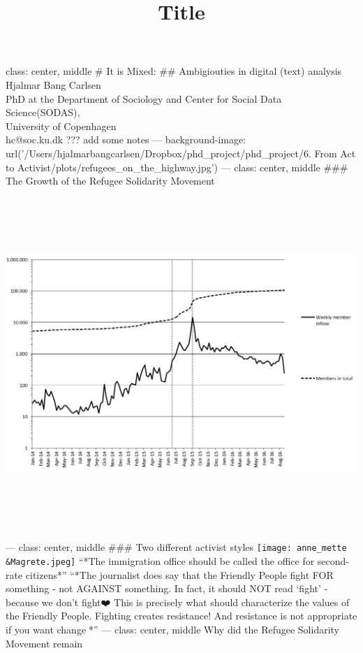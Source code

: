 \documentclass[ignorenonframetext,]{beamer}
\title{Title}
\date{}
\begin{document}
\frame{\titlepage}

\begin{frame}

class: center, middle \# It is Mixed: \#\# Ambigiouties in digital
(text) analysis Hjalmar Bang Carlsen\\
PhD at the Department of Sociology and Center for Social Data
Science(SODAS),\\
University of Copenhagen\\
hc@soc.ku.dk ??? add some notes --- background-image:
url('/Users/hjalmarbangcarlsen/Dropbox/phd\_project/phd\_project/6. From
Act to Activist/plots/refugees\_on\_the\_highway.jpg') --- class:
center, middle \#\#\# The Growth of the Refugee Solidarity Movement
\includegraphics[width=8.33333in,height=5.20833in]{figure1.png} ---
class: center, middle \#\#\# Two different activist styles
\texttt{[image: anne\_mette\\\&Magrete.jpeg]}
``*The immigration office should be called the office for second-rate
citizens*'' ``*The journalist does say that the Friendly People fight
FOR something - not AGAINST something. In fact, it should NOT read
`fight' - because we don't fight❤️ This is precisely what should
characterize the values of the Friendly People. Fighting creates
resistance! And resistance is not appropriate if you want change🍃*'' ---
class: center, middle Why did the Refugee Solidarity Movement remain

\end{frame}
\end{document}
